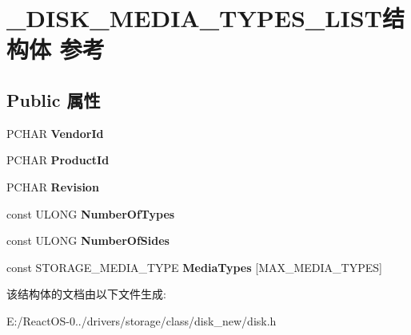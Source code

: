 \hypertarget{struct___d_i_s_k___m_e_d_i_a___t_y_p_e_s___l_i_s_t}{}\section{\+\_\+\+D\+I\+S\+K\+\_\+\+M\+E\+D\+I\+A\+\_\+\+T\+Y\+P\+E\+S\+\_\+\+L\+I\+S\+T结构体 参考}
\label{struct___d_i_s_k___m_e_d_i_a___t_y_p_e_s___l_i_s_t}
\subsection*{Public 属性}
\begin{DoxyCompactItemize}
\item 
\mbox{\label{struct___d_i_s_k___m_e_d_i_a___t_y_p_e_s___l_i_s_t_a91ca5f50c422406f02cc0be4b765e965}} 
P\+C\+H\+AR {\bfseries Vendor\+Id}
\item 
\mbox{\label{struct___d_i_s_k___m_e_d_i_a___t_y_p_e_s___l_i_s_t_a97058d1634a1a2b70de79bc13869d8b6}} 
P\+C\+H\+AR {\bfseries Product\+Id}
\item 
\mbox{\label{struct___d_i_s_k___m_e_d_i_a___t_y_p_e_s___l_i_s_t_a5321306aae28ef4c5bae7b47a48f8b5c}} 
P\+C\+H\+AR {\bfseries Revision}
\item 
\mbox{\label{struct___d_i_s_k___m_e_d_i_a___t_y_p_e_s___l_i_s_t_a858bc5ed804248e247b8e0dc0d0f91e0}} 
const U\+L\+O\+NG {\bfseries Number\+Of\+Types}
\item 
\mbox{\label{struct___d_i_s_k___m_e_d_i_a___t_y_p_e_s___l_i_s_t_aa08d22452bebd62852dabebab436c0f8}} 
const U\+L\+O\+NG {\bfseries Number\+Of\+Sides}
\item 
\mbox{\label{struct___d_i_s_k___m_e_d_i_a___t_y_p_e_s___l_i_s_t_a2b9c61a97799f89ededa99966cef9f2c}} 
const S\+T\+O\+R\+A\+G\+E\+\_\+\+M\+E\+D\+I\+A\+\_\+\+T\+Y\+PE {\bfseries Media\+Types} \mbox{[}M\+A\+X\+\_\+\+M\+E\+D\+I\+A\+\_\+\+T\+Y\+P\+ES\mbox{]}
\end{DoxyCompactItemize}


该结构体的文档由以下文件生成\+:\begin{DoxyCompactItemize}
\item 
E\+:/\+React\+O\+S-\/0../drivers/storage/class/disk\+\_\+new/disk.\+h\end{DoxyCompactItemize}
